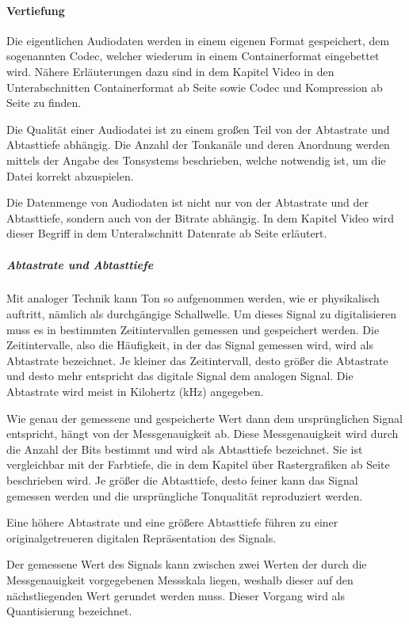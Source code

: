 \paragraph{Vertiefung} Die eigentlichen Audiodaten werden in einem eigenen Format gespeichert, dem sogenannten Codec, welcher wiederum in einem Containerformat eingebettet wird. Nähere Erläuterungen dazu sind in dem Kapitel Video in den Unterabschnitten Containerformat ab Seite \pageref{video-container} sowie Codec und Kompression ab Seite \pageref{video-codec} zu finden.

Die Qualität einer Audiodatei ist zu einem großen Teil von der Abtastrate und Abtasttiefe abhängig. Die Anzahl der Tonkanäle und deren Anordnung werden mittels der Angabe des Tonsystems beschrieben, welche notwendig ist, um die Datei korrekt abzuspielen.

Die Datenmenge von Audiodaten ist nicht nur von der Abtastrate und der Abtasttiefe, sondern auch von der Bitrate abhängig. In dem Kapitel Video wird dieser Begriff in dem Unterabschnitt Datenrate ab Seite \pageref{video-datenrate} erläutert.

\subparagraph{Abtastrate und Abtasttiefe}
Mit analoger Technik kann Ton so aufgenommen werden, wie er physikalisch auftritt, nämlich als durchgängige Schallwelle. Um dieses Signal zu digitalisieren muss es in bestimmten Zeitintervallen gemessen und gespeichert werden. Die Zeitintervalle, also die Häufigkeit, in der das Signal gemessen wird, wird als Abtastrate bezeichnet. Je kleiner das Zeitintervall, desto größer die Abtastrate und desto mehr entspricht das digitale Signal dem analogen Signal. Die Abtastrate wird meist in Kilohertz (kHz) angegeben.

Wie genau der gemessene und gespeicherte Wert dann dem ursprünglichen Signal entspricht, hängt von der Messgenauigkeit ab. Diese Messgenauigkeit wird durch die Anzahl der Bits bestimmt und wird als Abtasttiefe bezeichnet. Sie ist vergleichbar mit der Farbtiefe, die in dem Kapitel über Rastergrafiken ab Seite \pageref{RG_Farbtiefe} beschrieben wird. Je größer die Abtasttiefe, desto feiner kann das Signal gemessen werden und die ursprüngliche Tonqualität reproduziert werden.

Eine höhere Abtastrate und eine größere Abtasttiefe führen zu einer originalgetreueren digitalen Repräsentation des Signals.

Der gemessene Wert des Signals kann zwischen zwei Werten der durch die Messgenauigkeit vorgegebenen Messskala liegen, weshalb dieser auf den nächstliegenden Wert gerundet werden muss. Dieser Vorgang wird als Quantisierung bezeichnet.

